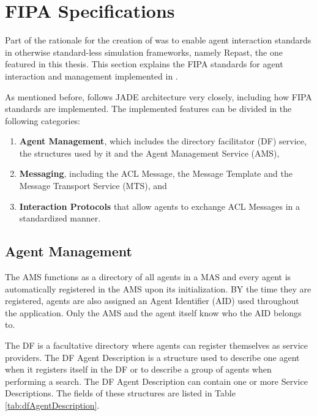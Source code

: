 \section{FIPA Specifications}
\label{sec:solution-fipa}

Part of the rationale for the creation of \apiname{} was to enable agent interaction standards in otherwise standard-less simulation frameworks, namely Repast, the one featured in this thesis. This section explains the FIPA standards for agent interaction and management implemented in \apiname{}.

As mentioned before, \apiname{} follows JADE architecture very closely, including how FIPA standards are implemented. The implemented features can be divided in the following categories:

\begin{enumerate}
  \item \textbf{Agent Management}, which includes the directory facilitator (DF) service, the structures used by it and the Agent Management Service (AMS),
  \item \textbf{Messaging}, including the ACL Message, the Message Template and the Message Transport Service (MTS), and
  \item \textbf{Interaction Protocols} that allow agents to exchange ACL Messages in a standardized manner.
\end{enumerate}

\subsection{Agent Management}
The AMS functions as a directory of all agents in a MAS and every agent is automatically registered in the AMS upon its initialization. BY the time they are registered, agents are also assigned an Agent Identifier (AID) used throughout the application. Only the AMS and the agent itself know who the AID belongs to.

The DF is a facultative directory where agents can register themselves as service providers. The DF Agent Description is a structure used to describe one agent when it registers itself in the DF or to describe a group of agents when performing a search. The DF Agent Description can contain one or more Service Descriptions. The fields of these structures are listed in Table \ref{tab:dfAgentDescription}.

